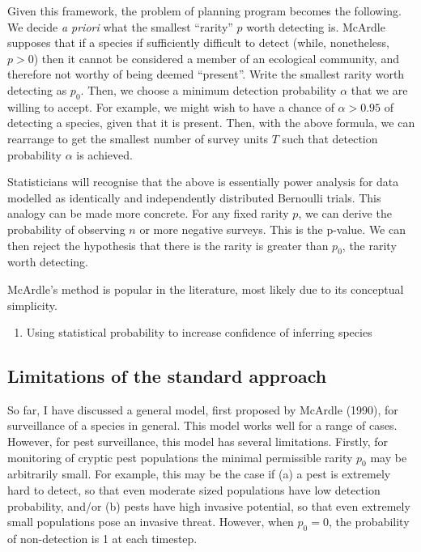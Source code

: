 \documentclass[
]{book}
\providecommand{\tightlist}{%
  \setlength{\itemsep}{0pt}\setlength{\parskip}{0pt}}
\begin{document}
Given this framework, the problem of planning program becomes the following. We decide \emph{a priori} what the smallest ``rarity'' \(p\) worth detecting is. McArdle supposes that if a species if sufficiently difficult to detect (while, nonetheless, \(p > 0\)) then it cannot be considered a member of an ecological community, and therefore not worthy of being deemed ``present''. Write the smallest rarity worth detecting as \(p_0\). Then, we choose a minimum detection probability \(\alpha\) that we are willing to accept. For example, we might wish to have a chance of \(\alpha > 0.95\) of detecting a species, given that it is present. Then, with the above formula, we can rearrange to get the smallest number of survey units \(T\) such that detection probability \(\alpha\) is achieved.

Statisticians will recognise that the above is essentially power analysis for data modelled as identically and independently distributed Bernoulli trials. This analogy can be made more concrete. For any fixed rarity \(p\), we can derive the probability of observing \(n\) or more negative surveys. This is the p-value. We can then reject the hypothesis that there is the rarity is greater than \(p_0\), the rarity worth detecting.

McArdle's method is popular in the literature, most likely due to its conceptual simplicity.

\begin{enumerate}
\def\labelenumi{\arabic{enumi}.}
\setcounter{enumi}{1995}
\tightlist
\item
  Using statistical probability to increase confidence of inferring species
\end{enumerate}

\hypertarget{limitations-of-the-standard-approach}{%
\subsection{Limitations of the standard approach}\label{limitations-of-the-standard-approach}}

So far, I have discussed a general model, first proposed by McArdle (1990), for surveillance of a species in general. This model works well for a range of cases. However, for pest surveillance, this model has several limitations. Firstly, for monitoring of cryptic pest populations the minimal permissible rarity \(p_0\) may be arbitrarily small. For example, this may be the case if (a) a pest is extremely hard to detect, so that even moderate sized populations have low detection probability, and/or (b) pests have high invasive potential, so that even extremely small populations pose an invasive threat. However, when \(p_0 = 0\), the probability of non-detection is 1 at each timestep.
\end{document}
